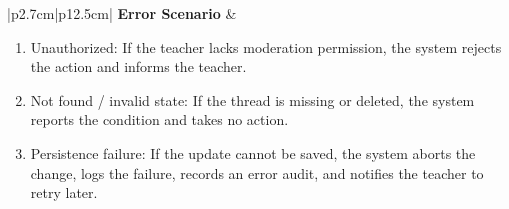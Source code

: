 \begin{table}[H]
\begin{tabular}{|p{2.7cm}|p{12.5cm}|}
        \textbf{Error Scenario} &
        \begin{minipage}[t]{\linewidth}
        \begin{enumerate}[topsep=0pt,itemsep=1pt,parsep=0pt,partopsep=0pt]
            \item Unauthorized: If the teacher lacks moderation permission, the system rejects the action and informs the teacher.
            \item Not found / invalid state: If the thread is missing or deleted, the system reports the condition and takes no action.
            \item Persistence failure: If the update cannot be saved, the system aborts the change, logs the failure, records an error audit, and notifies the teacher to retry later.
        \end{enumerate}
        \end{minipage}
        \\ \hline
    \end{tabular}
    \label{tab:teacher-pin-unpin-thread}
\end{table}
\iffalse
{}

